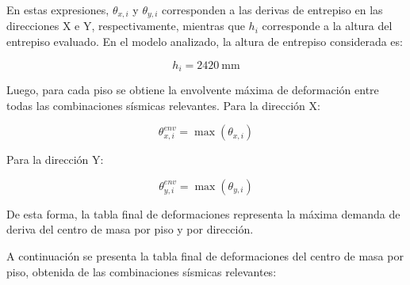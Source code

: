 En estas expresiones, $\theta_{x,i}$ y $\theta_{y,i}$ corresponden a las derivas de entrepiso en las direcciones X e Y, respectivamente, mientras que $h_i$ corresponde a la altura del entrepiso evaluado. En el modelo analizado, la altura de entrepiso considerada es:

\begin{equation}
h_i = 2420 \ \text{mm}
\end{equation}

Luego, para cada piso se obtiene la envolvente máxima de deformación entre todas las combinaciones sísmicas relevantes. Para la dirección X:

\begin{equation}
\theta_{x,i}^{env} =
\max \left( \theta_{x,i} \right)
\end{equation}

Para la dirección Y:

\begin{equation}
\theta_{y,i}^{env} =
\max \left( \theta_{y,i} \right)
\end{equation}

De esta forma, la tabla final de deformaciones representa la máxima demanda de deriva del centro de masa por piso y por dirección.

A continuación se presenta la tabla final de deformaciones del centro de masa por piso, obtenida de las combinaciones sísmicas relevantes:

